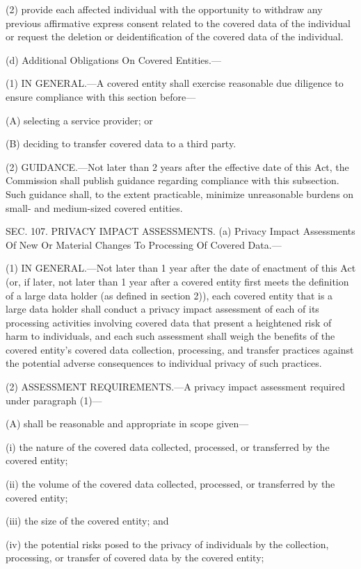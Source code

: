 (2) provide each affected individual with the opportunity to withdraw any previous affirmative express consent related to the covered data of the individual or request the deletion or deidentification of the covered data of the individual.

(d) Additional Obligations On Covered Entities.—

(1) IN GENERAL.—A covered entity shall exercise reasonable due diligence to ensure compliance with this section before—

(A) selecting a service provider; or

(B) deciding to transfer covered data to a third party.

(2) GUIDANCE.—Not later than 2 years after the effective date of this Act, the Commission shall publish guidance regarding compliance with this subsection. Such guidance shall, to the extent practicable, minimize unreasonable burdens on small- and medium-sized covered entities.


SEC. 107. PRIVACY IMPACT ASSESSMENTS.
(a) Privacy Impact Assessments Of New Or Material Changes To Processing Of Covered Data.—

(1) IN GENERAL.—Not later than 1 year after the date of enactment of this Act (or, if later, not later than 1 year after a covered entity first meets the definition of a large data holder (as defined in section 2)), each covered entity that is a large data holder shall conduct a privacy impact assessment of each of its processing activities involving covered data that present a heightened risk of harm to individuals, and each such assessment shall weigh the benefits of the covered entity's covered data collection, processing, and transfer practices against the potential adverse consequences to individual privacy of such practices.

(2) ASSESSMENT REQUIREMENTS.—A privacy impact assessment required under paragraph (1)—

(A) shall be reasonable and appropriate in scope given—

(i) the nature of the covered data collected, processed, or transferred by the covered entity;

(ii) the volume of the covered data collected, processed, or transferred by the covered entity;

(iii) the size of the covered entity; and

(iv) the potential risks posed to the privacy of individuals by the collection, processing, or transfer of covered data by the covered entity;

